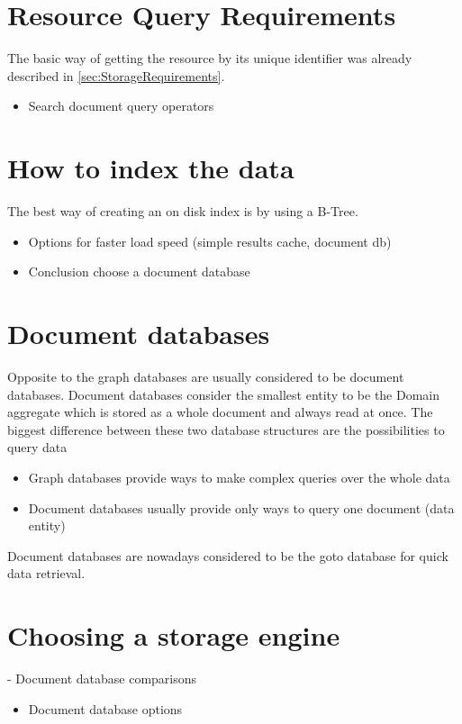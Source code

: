 \section{Resource Query Requirements}
The basic way of getting the resource by its unique identifier was already described in \autoref{sec:StorageRequirements}. 


\begin{itemize}
	\item Search document query operators
\end{itemize}

\section{How to index the data} %

The best way of creating an on disk index is by using a B-Tree.
\begin{itemize}
	\item Options for faster load speed (simple results cache, document db)
	\item Conclusion choose a document database
\end{itemize}

\section{Document databases}
Opposite to the graph databases are usually considered to be document databases. Document databases consider the smallest entity to be the Domain aggregate which is stored as a whole document and always read at once. The biggest difference between these two database structures are the possibilities to query data
\begin{itemize}
	\item Graph databases provide ways to make complex queries over the whole data
	\item Document databases usually provide only ways to query one document (data entity)
\end{itemize}
Document databases are nowadays considered to be the goto database for quick data retrieval.




\section{Choosing a storage engine}
- Document database comparisons
\begin{itemize}
	\item Document database options
\end{itemize}

